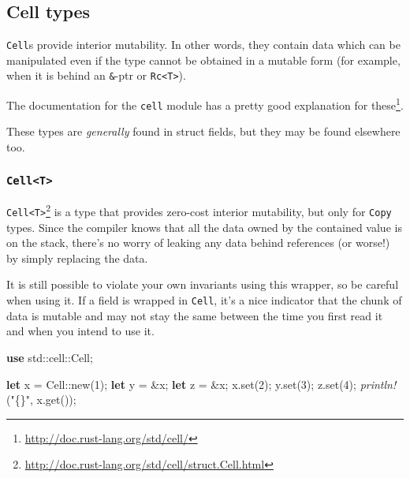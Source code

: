 \documentclass[a4paper,]{book}
\newenvironment{Shaded}{\begin{snugshade}}{\end{snugshade}}
\newcommand{\KeywordTok}[1]{\textcolor[rgb]{0.13,0.29,0.53}{\textbf{{#1}}}}
\newcommand{\DecValTok}[1]{\textcolor[rgb]{0.00,0.00,0.81}{{#1}}}
\newcommand{\StringTok}[1]{\textcolor[rgb]{0.31,0.60,0.02}{{#1}}}
\newcommand{\PreprocessorTok}[1]{\textcolor[rgb]{0.56,0.35,0.01}{\textit{{#1}}}}
\newcommand{\NormalTok}[1]{{#1}}
\renewcommand{\href}[2]{#2\footnote{\url{#1}}}
\begin{document}
\subsection{Cell types}\label{cell-types}

\texttt{Cell}s provide interior mutability. In other words, they contain
data which can be manipulated even if the type cannot be obtained in a
mutable form (for example, when it is behind an \texttt{\&}-ptr or
\texttt{Rc\textless{}T\textgreater{}}).

\href{http://doc.rust-lang.org/std/cell/}{The documentation for the
\texttt{cell} module has a pretty good explanation for these}.

These types are \emph{generally} found in struct fields, but they may be
found elsewhere too.

\subsubsection{\texorpdfstring{\texttt{Cell\textless{}T\textgreater{}}}{Cell\textless{}T\textgreater{}}}\label{cellt}

\href{http://doc.rust-lang.org/std/cell/struct.Cell.html}{\texttt{Cell\textless{}T\textgreater{}}}
is a type that provides zero-cost interior mutability, but only for
\texttt{Copy} types. Since the compiler knows that all the data owned by
the contained value is on the stack, there's no worry of leaking any
data behind references (or worse!) by simply replacing the data.

It is still possible to violate your own invariants using this wrapper,
so be careful when using it. If a field is wrapped in \texttt{Cell},
it's a nice indicator that the chunk of data is mutable and may not stay
the same between the time you first read it and when you intend to use
it.

\begin{Shaded}
\begin{Highlighting}[]
\KeywordTok{use} \NormalTok{std::cell::Cell;}

\KeywordTok{let} \NormalTok{x = Cell::new(}\DecValTok{1}\NormalTok{);}
\KeywordTok{let} \NormalTok{y = &x;}
\KeywordTok{let} \NormalTok{z = &x;}
\NormalTok{x.set(}\DecValTok{2}\NormalTok{);}
\NormalTok{y.set(}\DecValTok{3}\NormalTok{);}
\NormalTok{z.set(}\DecValTok{4}\NormalTok{);}
\PreprocessorTok{println!}\NormalTok{(}\StringTok{"\{\}"}\NormalTok{, x.get());}
\end{Highlighting}
\end{Shaded}
\end{document}
